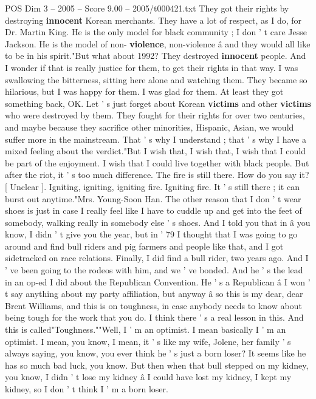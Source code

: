 \begin{textsample}{POS Dim 3 – 2005 – Score 9.00 – 2005/t000421.txt}
They got their rights by destroying \textbf{innocent} Korean merchants.
They have a lot of respect, as I do, for Dr.
Martin King.
He is the only model for black community ; I don ' t care Jesse Jackson.
He is the model of non- \textbf{violence}, non-violence â and they would all like to be in his spirit."But what about 1992?
They destroyed \textbf{innocent} people.
And I wonder if that is really justice for them, to get their rights in that way.
I was swallowing the bitterness, sitting here alone and watching them.
They became so hilarious, but I was happy for them.
I was glad for them.
At least they got something back, OK.
Let ' s just forget about Korean \textbf{victims} and other \textbf{victims} who were destroyed by them.
They fought for their rights for over two centuries, and maybe because they sacrifice other minorities, Hispanic, Asian, we would suffer more in the mainstream.
That ' s why I understand ; that ' s why I have a mixed feeling about the verdict."But I wish that, I wish that, I wish that I could be part of the enjoyment.
I wish that I could live together with black people.
But after the riot, it ' s too much difference.
The fire is still there.
How do you say it? [ Unclear ].
Igniting, igniting, igniting fire.
Igniting fire.
It ' s still there ; it can burst out anytime."Mrs.
Young-Soon Han.
The other reason that I don ' t wear shoes is just in case I really feel like I have to cuddle up and get into the feet of somebody, walking really in somebody else ' s shoes.
And I told you that in â you know, I didn ' t give you the year, but in ' 79 I thought that I was going to go around and find bull riders and pig farmers and people like that, and I got sidetracked on race relations.
Finally, I did find a bull rider, two years ago.
And I ' ve been going to the rodeos with him, and we ' ve bonded.
And he ' s the lead in an op-ed I did about the Republican Convention.
He ' s a Republican â I won ' t say anything about my party affiliation, but anyway â so this is my dear, dear Brent Williams, and this is on toughness, in case anybody needs to know about being tough for the work that you do.
I think there ' s a real lesson in this.
And this is called"Toughness.""Well, I ' m an optimist.
I mean basically I ' m an optimist.
I mean, you know, I mean, it ' s like my wife, Jolene, her family ' s always saying, you know, you ever think he ' s just a born loser?
It seems like he has so much bad luck, you know.
But then when that bull stepped on my kidney, you know, I didn ' t lose my kidney â I could have lost my kidney, I kept my kidney, so I don ' t think I ' m a born loser.

\end{textsample}

